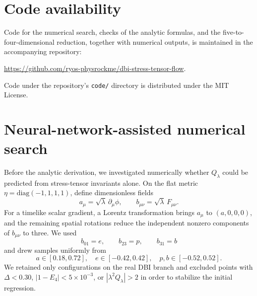 \documentclass[a4paper,11pt]{article}
\numberwithin{equation}{section}
\begin{document}
\section*{Code availability}

Code for the numerical search, checks of the analytic formulas, and the five-to-four-dimensional reduction, together with numerical outputs, is maintained in the accompanying repository:\par\smallskip\noindent\url{https://github.com/ryos-physrockme/dbi-stress-tensor-flow}.\par\smallskip\noindent Code under the repository's \texttt{code/} directory is distributed under the MIT License.

\appendix

\section{Neural-network-assisted numerical search}
\label{app:numerical-search}

Before the analytic derivation, we investigated numerically whether $Q_\lambda$ could be predicted from stress-tensor invariants alone. On the flat metric $\eta=\mathrm{diag}(-1,1,1,1)$, define dimensionless fields
\begin{equation}
 a_\mu=\sqrt\lambda\,\partial_\mu\phi,
 \qquad
 b_{\mu\nu}=\sqrt\lambda\,F_{\mu\nu}.
 \label{eq:dimensionless-fields-nn}
\end{equation}
For a timelike scalar gradient, a Lorentz transformation brings $a_\mu$ to $(a,0,0,0)$, and the remaining spatial rotations reduce the independent nonzero components of $b_{\mu\nu}$ to three. We used
\begin{equation}
 b_{01}=e,\qquad b_{23}=p,\qquad b_{31}=b
\end{equation}
and drew samples uniformly from
\begin{equation}
 a\in[0.18,0.72],\quad
 e\in[-0.42,0.42],\quad
 p,b\in[-0.52,0.52].
 \label{eq:nn-sampling-range}
\end{equation}
We retained only configurations on the real DBI branch and excluded points with $\Delta<0.30$, $|1-E_4|<5\times10^{-3}$, or $|\lambda^2Q_\lambda|>2$ in order to stabilize the initial regression.
\end{document}
